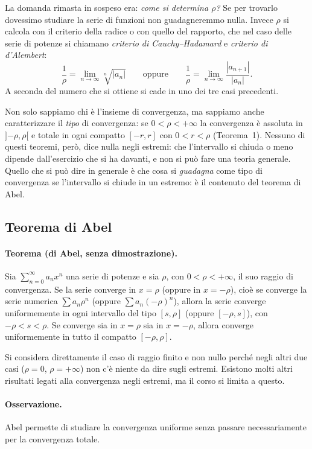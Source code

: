 La domanda rimasta in sospeso era: \emph{come si determina $\rho$?}
Se per trovarlo dovessimo studiare la serie di funzioni non guadagneremmo nulla. Invece $\rho$ si calcola con il
criterio della radice o con quello del rapporto, che nel caso delle serie di potenze si chiamano
\emph{criterio di Cauchy--Hadamard} e \emph{criterio di d'Alembert}:
\[
  \frac{1}{\rho} = \lim_{n\to\infty} \sqrt[n]{|a_n|}
  \qquad\text{oppure}\qquad
  \frac{1}{\rho} = \lim_{n\to\infty} \frac{|a_{n+1}|}{|a_n|} .
\]
A seconda del numero che si ottiene si cade in uno dei tre casi precedenti.

Non solo sappiamo chi è l'insieme di convergenza, ma sappiamo anche caratterizzare il \emph{tipo} di
convergenza: se $0<\rho<+\infty$ la convergenza è assoluta in $]{-\rho},\rho[$ e totale in ogni compatto
$[-r,r]$ con $0<r<\rho$ (Teorema~1). Nessuno di questi teoremi, però, dice nulla negli estremi: che l'intervallo
si chiuda o meno dipende dall'esercizio che si ha davanti, e non si può fare una teoria generale. Quello che si
può dire in generale è che cosa si \emph{guadagna} come tipo di convergenza se l'intervallo si chiude in un
estremo: è il contenuto del teorema di Abel.

\subsection{Teorema di Abel}

\paragraph{Teorema (di Abel, senza dimostrazione).}
Sia $\sum_{n=0}^{\infty} a_n x^n$ una serie di potenze e sia $\rho$, con $0<\rho<+\infty$, il suo raggio di
convergenza. Se la serie converge in $x=\rho$ (oppure in $x=-\rho$), cioè se converge la serie numerica
$\sum a_n \rho^n$ (oppure $\sum a_n (-\rho)^n$), allora la serie converge uniformemente in ogni intervallo del
tipo $[s,\rho]$ (oppure $[-\rho,s]$), con $-\rho<s<\rho$. Se converge sia in $x=\rho$ sia in $x=-\rho$, allora
converge uniformemente in tutto il compatto $[-\rho,\rho]$.

Si considera direttamente il caso di raggio finito e non nullo perché negli altri due casi ($\rho=0$,
$\rho=+\infty$) non c'è niente da dire sugli estremi. Esistono molti altri risultati legati alla convergenza
negli estremi, ma il corso si limita a questo.

\paragraph{Osservazione.}
Abel permette di studiare la convergenza uniforme senza passare necessariamente per la convergenza totale.

